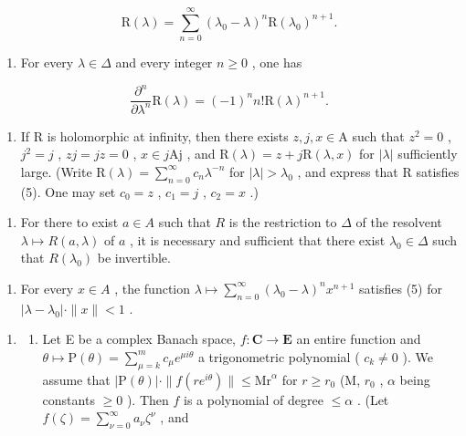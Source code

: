 \[
\mathrm{R} (\lambda) = \sum_ {n = 0} ^ {\infty} (\lambda_ {0} - \lambda) ^ {n} \mathrm{R} (\lambda_ {0}) ^ {n + 1}.
\]

\begin{enumerate}
\def\labelenumi{\alph{enumi})}
\setcounter{enumi}{1}
\tightlist
\item
  For every \(\lambda \in \Delta\) and every integer \(n\geqslant 0\) , one has
\end{enumerate}

\[
\frac {\partial^ {n}}{\partial \lambda^ {n}} \mathrm{R} (\lambda) = (- 1) ^ {n} n! \mathrm{R} (\lambda) ^ {n + 1}.
\]

\begin{enumerate}
\def\labelenumi{\alph{enumi})}
\setcounter{enumi}{2}
\tightlist
\item
  If R is holomorphic at infinity, then there exists \(z, j, x \in \mathrm{A}\) such that \(z^2 = 0\) , \(j^2 = j\) , \(zj = jz = 0\) , \(x \in j\mathrm{Aj}\) , and \(\mathrm{R}(\lambda) = z + j\mathrm{R}(\lambda, x)\) for \(|\lambda|\) sufficiently large. (Write \(\mathrm{R}(\lambda) = \sum_{n=0}^{\infty} c_n \lambda^{-n}\) for \(|\lambda| > \lambda_0\) , and express that R satisfies (5). One may set \(c_0 = z\) , \(c_1 = j\) , \(c_2 = x\) .)
\end{enumerate}

\begin{enumerate}
\def\labelenumi{\alph{enumi})}
\setcounter{enumi}{3}
\tightlist
\item
  For there to exist \(a \in A\) such that \(R\) is the restriction to \(\Delta\) of the resolvent \(\lambda \mapsto R(a, \lambda)\) of \(a\) , it is necessary and sufficient that there exist \(\lambda_0 \in \Delta\) such that \(R(\lambda_0)\) be invertible.
\end{enumerate}

\begin{enumerate}
\def\labelenumi{\alph{enumi})}
\setcounter{enumi}{4}
\tightlist
\item
  For every \(x \in A\) , the function \(\lambda \mapsto \sum_{n=0}^{\infty} (\lambda_0 - \lambda)^n x^{n+1}\) satisfies (5) for \(|\lambda - \lambda_0| \cdot \|x\| < 1\) .
\end{enumerate}

\begin{enumerate}
\def\labelenumi{\arabic{enumi})}
\setcounter{enumi}{28}
\tightlist
\item
  \begin{enumerate}
  \def\labelenumii{\alph{enumii})}
  \tightlist
  \item
    Let E be a complex Banach space, \(f: \mathbf{C} \to \mathbf{E}\) an entire function and \(\theta \mapsto \mathrm{P}(\theta) = \sum_{\mu=k}^{m} c_{\mu} e^{\mu i\theta}\) a trigonometric polynomial ( \(c_k \neq 0\) ). We assume that \(|\mathrm{P}(\theta)| \cdot \|f(re^{i\theta})\| \leqslant \mathrm{Mr}^{\alpha}\) for \(r \geqslant r_0\) (M, \(r_0\) , \(\alpha\) being constants \(\geqslant 0\) ). Then \(f\) is a polynomial of degree \(\leqslant \alpha\) . (Let \(f(\zeta) = \sum_{\nu=0}^{\infty} a_{\nu} \zeta^{\nu}\) , and
  \end{enumerate}
\end{enumerate}

